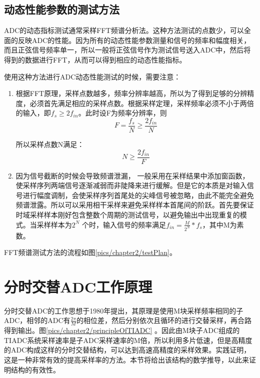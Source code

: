 	\subsection{动态性能参数的测试方法}
		ADC的动态指标测试通常采样FFT频谱分析法。这种方法测试的点数少，可以全面的反映ADC的性能。因为所有的动态性能参数测量和信号的频率和幅度相关，而且正弦信号频率单一，所以一般将正弦信号作为测试信号送入ADC中，然后将得到的数据进行FFT，从而可以得到相应的动态性能指标。\par
		使用这种方法进行ADC动态性能测试的时候，需要注意：
		\begin{enumerate}
			\item 
				根据FFT原理，采样点数越多，频率分辨率越高，所以为了得到足够的分辨精度，必须首先满足相应的采样点数。根据采样定理，采样频率必须不小于两倍的输入，即$f_s \ge 2f_{in}$。此时设F为频率分辨率，则
				\begin{equation}
					F = \frac{{{f_s}}}{N} \ge \frac{{2{f_{in}}}}{N}
				\end{equation}
				
				所以采样点数N满足：
				\begin{equation}
					N \ge \frac{{2{f_{in}}}}{F}
				\end{equation}
			\item
				因为信号截断的时候会导致频谱泄漏，		一般采用在采样结果中添加窗函数，使采样序列两端信号逐渐减弱而非陡降来进行缓解。但是它的本质是对输入信号进行幅度调制，会使采样序列首尾处的尖峰信号被忽略，由此不能完全避免频谱泄露。所以可以采用相干采样来避免采样样本首尾间的阶跃。首先要保证时域采样样本刚好包含整数个周期的测试信号，以避免输出中出现重复的模式。当采样样本为$2^N$ 个时，输入信号的频率满足${f_{in}} = \frac{M}{{{2^N}}}*{f_s}$，其中M为素数。
			
		\end{enumerate}
		
		FFT频谱测试方法的流程如图\ref{pics/chapter2/testPlan}。

		
\section{分时交替ADC工作原理}\label{sec:principleOfTIADC}
	分时交替ADC的工作思想于1980年提出，其原理是使用M块采样频率相同的子ADC，相邻的ADC有$\frac{2\pi }{M}$的相位差，然后分别依次且循环的进行交替采样，再合路得到输出。图\ref{pics/chapter2/principleOfTIADC}	。因此由M块子ADC组成的TIADC系统采样速率是子ADC采样速率的M倍，所以利用多片低速，但是高精度的ADC构成这样的分时交替结构，可以达到高速高精度的采样效果。实践证明，这是一种非常有效的提高采样率的方法。本节将给出该结构的数学推导，以此来证明结构的有效性。
	
